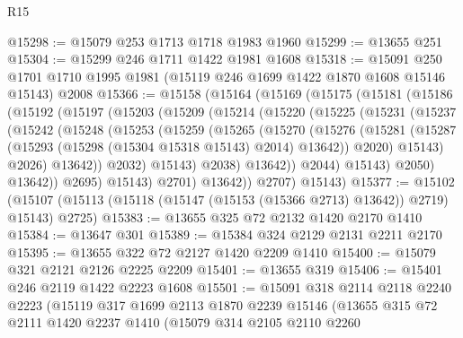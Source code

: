 \begin{lexlean}{R15}
\begin{coremodule}
@15298 := @15079 @253 @1713 @1718 @1983 @1960
@15299 := @13655 @251
@15304 := @15299 @246 @1711 @1422 @1981 @1608
@15318 := @15091
    @250
    @1701
    @1710
    @1995
    @1981
    (@15119 @246 @1699 @1422 @1870 @1608 @15146 @15143)
    @2008
@15366 := @15158
    (@15164
      (@15169
        (@15175
          (@15181
            (@15186
              (@15192
                (@15197
                  (@15203
                    (@15209
                      (@15214
                        (@15220
                          (@15225
                            (@15231
                              (@15237
                                (@15242
                                  (@15248
                                    (@15253
                                      (@15259
                                        (@15265
                                          (@15270
                                            (@15276
                                              (@15281
                                                (@15287
                                                  (@15293
                                                    (@15298 (@15304 @15318 @15143) @2014)
                                                    @13642))
                                                @2020)
                                              @15143)
                                            @2026)
                                          @13642))
                                      @2032)
                                    @15143)
                                  @2038)
                                @13642))
                            @2044)
                          @15143)
                        @2050)
                      @13642))
                  @2695)
                @15143)
              @2701)
            @13642))
        @2707)
      @15143)
@15377 := @15102
    (@15107 (@15113 (@15118 (@15147 (@15153 (@15366 @2713) @13642)) @2719) @15143) @2725)
@15383 := @13655 @325 @72 @2132 @1420 @2170 @1410
@15384 := @13647 @301
@15389 := @15384 @324 @2129 @2131 @2211 @2170
@15395 := @13655 @322 @72 @2127 @1420 @2209 @1410
@15400 := @15079 @321 @2121 @2126 @2225 @2209
@15401 := @13655 @319
@15406 := @15401 @246 @2119 @1422 @2223 @1608
@15501 := @15091
    @318
    @2114
    @2118
    @2240
    @2223
    (@15119
      @317
      @1699
      @2113
      @1870
      @2239
      @15146
      (@13655
        @315
        @72
        @2111
        @1420
        @2237
        @1410
        (@15079
          @314
          @2105
          @2110
          @2260

\end{coremodule}
\end{lexlean}
